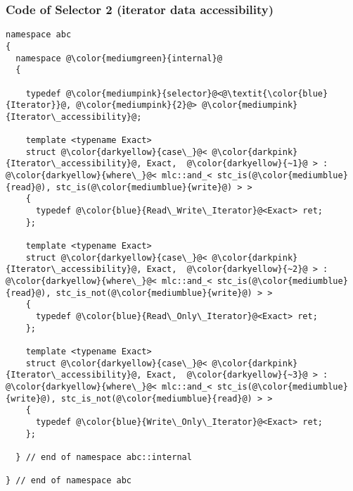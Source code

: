 \begin{frame}[fragile]
  \frametitle{Code of Selector 2 (iterator data accessibility)}

\begin{lstlisting}[escapechar=@,basicstyle={\tiny\sffamily}]
namespace abc
{
  namespace @\color{mediumgreen}{internal}@
  {

    typedef @\color{mediumpink}{selector}@<@\textit{\color{blue}{Iterator}}@, @\color{mediumpink}{2}@> @\color{mediumpink}{Iterator\_accessibility}@;
  
    template <typename Exact>
    struct @\color{darkyellow}{case\_}@< @\color{darkpink}{Iterator\_accessibility}@, Exact,  @\color{darkyellow}{~1}@ > : @\color{darkyellow}{where\_}@< mlc::and_< stc_is(@\color{mediumblue}{read}@), stc_is(@\color{mediumblue}{write}@) > >
    {
      typedef @\color{blue}{Read\_Write\_Iterator}@<Exact> ret;
    };
  
    template <typename Exact>
    struct @\color{darkyellow}{case\_}@< @\color{darkpink}{Iterator\_accessibility}@, Exact,  @\color{darkyellow}{~2}@ > : @\color{darkyellow}{where\_}@< mlc::and_< stc_is(@\color{mediumblue}{read}@), stc_is_not(@\color{mediumblue}{write}@) > >
    {
      typedef @\color{blue}{Read\_Only\_Iterator}@<Exact> ret;
    };
  
    template <typename Exact>
    struct @\color{darkyellow}{case\_}@< @\color{darkpink}{Iterator\_accessibility}@, Exact,  @\color{darkyellow}{~3}@ > : @\color{darkyellow}{where\_}@< mlc::and_< stc_is(@\color{mediumblue}{write}@), stc_is_not(@\color{mediumblue}{read}@) > >
    {
      typedef @\color{blue}{Write\_Only\_Iterator}@<Exact> ret;
    };
    
  } // end of namespace abc::internal

} // end of namespace abc
\end{lstlisting}

\end{frame}



